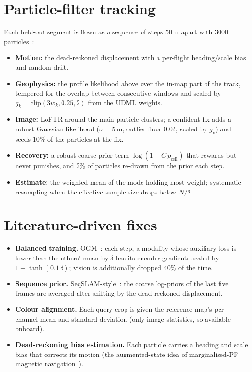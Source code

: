 \documentclass[11pt,a4paper]{article}
\begin{document}
\section{Particle-filter tracking}\label{sec:pf}
Each held-out segment is flown as a sequence of steps 50\,m apart with 3000 particles~\cite{gordon1993pf,thrun2005probabilistic}:
\begin{itemize}
\item \textbf{Motion:} the dead-reckoned displacement with a per-flight heading/scale bias and random drift.
\item \textbf{Geophysics:} the profile likelihood above over the in-map part of the track, tempered for
the overlap between consecutive windows and scaled by $g_k=\mathrm{clip}(3w_k,0.25,2)$ from the UDML weights.
\item \textbf{Image:} LoFTR around the main particle clusters; a confident fix adds a robust Gaussian
likelihood ($\sigma=5$\,m, outlier floor 0.02, scaled by $g_v$) and seeds 10\% of the particles at the fix.
\item \textbf{Recovery:} a robust coarse-prior term $\log(1+C\,p_\text{cell})$ that rewards but never
punishes, and 2\% of particles re-drawn from the prior each step.
\item \textbf{Estimate:} the weighted mean of the mode holding most weight; systematic resampling when the
effective sample size drops below $N/2$.
\end{itemize}

\section{Literature-driven fixes}\label{sec:phase3}
\begin{itemize}
\item \textbf{Balanced training.} OGM~\cite{peng2022ogm}: each step, a modality whose auxiliary loss is
lower than the others' mean by $\delta$ has its encoder gradients scaled by $1-\tanh(0.1\,\delta)$;
vision is additionally dropped 40\% of the time.
\item \textbf{Sequence prior.} SeqSLAM-style~\cite{milford2012seqslam,garg2021seqnet}: the coarse
log-priors of the last five frames are averaged after shifting by the dead-reckoned displacement.
\item \textbf{Colour alignment.} Each query crop is given the reference map's per-channel mean and
standard deviation (only image statistics, so available onboard).
\item \textbf{Dead-reckoning bias estimation.} Each particle carries a heading and scale bias that
corrects its motion (the augmented-state idea of marginalised-PF magnetic navigation~\cite{canciani2016absolute,magnavjl}).
\end{itemize}
\end{document}
